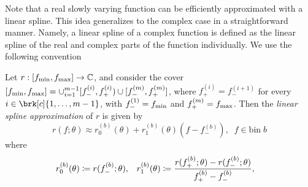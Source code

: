 Note that a real slowly varying function can be efficiently approximated with a linear spline.
This idea generalizes to the complex case in a straightforward manner.
Namely, a linear spline of a complex function is defined as the linear spline of the real and complex parts of the function individually.
We use the following convention
\begin{definition}[]\label{}
Let $r:[f_{\text{min}},f_{\text{max}}] \to \mathbb{C}$, and consider the cover $[f_{\text{min}}, f_{\text{max}}] = \cup_{i=1}^{m-1}[f_-^{(i)}, f_+^{(i)}) \cup [f_-^{(m)}, f^{(m)}_+]$, where $f_+^{(i)}=f_-^{(i+1)}$ for every $i \in \brk[c]{1, \ldots, m-1}$, with $f_-^{(1)}=f_{\text{min}}$ and $ f_+^{(m)}=f_{\text{max}}$. Then the \textit{linear spline approximation} of $r$ is given by
\begin{equation}\label{}
r(f; \theta) \approx r_0^{(b)}(\theta) + r_1^{(b)}(\theta)(f-f_-^{(b)}), \; \; f \in \text{bin} \; b
\end{equation}
where
\begin{align*}
r_0^{(b)}(\theta) &\coloneqq r(f_-^{(b)};\theta) , &
r_1^{(b)}(\theta) &\coloneqq \frac{r(f_+^{(b)};\theta) - r(f_-^{(b)}; \theta)}{f_+^{(b)} - f_-^{(b)}}, &
\end{align*}
\end{definition}


